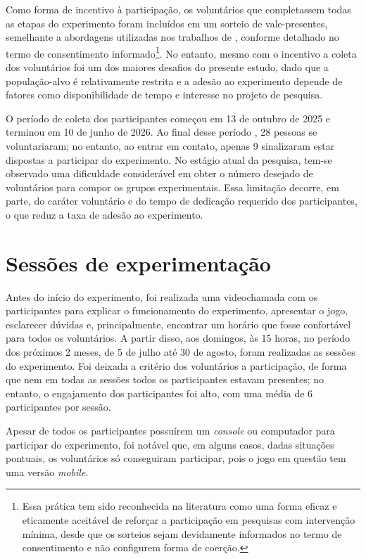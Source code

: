     Como forma de incentivo à participação, os voluntários que completassem todas as etapas do experimento foram incluídos em um sorteio de vale-presentes, semelhante a abordagens utilizadas nos trabalhos de \cite{Maloney2020, Brakel2023}, conforme detalhado no termo de consentimento informado\footnote{Essa prática tem sido reconhecida na literatura como uma forma eficaz e eticamente aceitável de reforçar a participação em pesquisas com intervenção mínima, desde que os sorteios sejam devidamente informados no termo de consentimento e não configurem forma de coerção.}. No entanto, mesmo com o incentivo a coleta dos voluntários foi um dos maiores desafios do presente estudo, dado que a população-alvo é relativamente restrita e a adesão ao experimento depende de fatores como disponibilidade de tempo e interesse no projeto de pesquisa.

    O período de coleta dos participantes começou em 13 de outubro de 2025 e terminou em 10 de junho de 2026. Ao final desse período , 28 pessoas se voluntariaram; no entanto, ao entrar em contato, apenas 9 sinalizaram estar dispostas a participar do experimento. No estágio atual da pesquisa, tem-se observado uma dificuldade considerável em obter o número desejado de voluntários para compor os grupos experimentais. Essa limitação decorre, em parte, do caráter voluntário e do tempo de dedicação requerido dos participantes, o que reduz a taxa de adesão ao experimento.


    \section{Sessões de experimentação}
    Antes do início do experimento, foi realizada uma videochamada com os participantes para explicar o funcionamento do experimento, apresentar o jogo, esclarecer dúvidas e, principalmente, encontrar um horário que fosse confortável para todos os voluntários. A partir disso, aos domingos, às 15 horas, no período dos próximos 2 meses, de 5 de julho até 30 de agosto, foram realizadas as sessões do  experimento.
    Foi deixada a critério dos voluntários a participação, de forma que nem em todas as sessões todos os participantes estavam presentes; no entanto, o engajamento dos participantes foi alto, com uma média de 6 participantes por sessão.

    Apesar de todos os participantes possuírem um \textit{console} ou computador para participar do experimento, foi notável que, em alguns casos, dadas situações pontuais, os voluntários só conseguiram participar, pois o jogo em questão tem uma versão \textit{mobile}.

